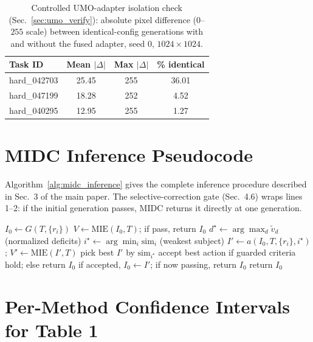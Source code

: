 \documentclass[letterpaper]{article}
\begin{document}
\begin{table}[t]
\centering
\small
\setlength{\tabcolsep}{4pt}
\begin{tabular}{lccc}
\toprule
Task ID & Mean $|\Delta|$ & Max $|\Delta|$ & \% identical \\
\midrule
hard\_042703 & 25.45 & 255 & 36.01 \\
hard\_047199 & 18.28 & 252 & 4.52 \\
hard\_040295 & 12.95 & 255 & 1.27 \\
\bottomrule
\end{tabular}
\caption{Controlled UMO-adapter isolation check (Sec.~\ref{sec:umo_verify}): absolute pixel difference ($0$--$255$ scale) between identical-config generations with and without the fused adapter, seed 0, $1024{\times}1024$.}
\label{tab:umo_check}
\end{table}

\section{MIDC Inference Pseudocode}
\label{sec:algorithm}

Algorithm~\ref{alg:midc_inference} gives the complete inference procedure described in Sec.~3 of the main paper. The selective-correction gate (Sec.~4.6) wraps lines 1--2: if the initial generation passes, MIDC returns it directly at one generation.

\begin{algorithm}[t]
\caption{MIDC inference (one task, one seed)}
\label{alg:midc_inference}
\begin{algorithmic}[1]
\STATE $I_0 \leftarrow G(T, \{r_i\})$
\STATE $V \leftarrow \mathrm{MIE}(I_0, T)$; if pass, return $I_0$
  \STATE $d^\star \leftarrow \arg\max_d \tilde{v}_d$ (normalized deficits)
  \STATE $i^\star \leftarrow \arg\min_i \mathrm{sim}_i$ (weakest subject)
      \STATE $I' \leftarrow a(I_0, T, \{r_i\}, i^\star)$; $V' \leftarrow \mathrm{MIE}(I', T)$
      \STATE pick best $I'$ by $\mathrm{sim}_{i^\star}$
    \ENDFOR
  \ENDFOR
  \STATE accept best action if guarded criteria hold; else return $I_0$
  \STATE if accepted, $I_0 \leftarrow I'$; if now passing, return $I_0$
\ENDFOR
\STATE return $I_0$
\end{algorithmic}
\end{algorithm}

\section{Per-Method Confidence Intervals for Table 1}
\label{sec:cis}
\end{document}
